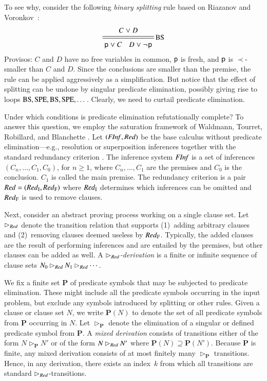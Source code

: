 \begin{rep}
To see why, consider the following \emph{binary splitting} rule
based on Riazanov and Vo\-ro\-nkov~\cite{riazanov-voronkov-2001}:
%
\[\namedsimp{BS}{C \cor D}{\cst{p} \cor C \quad D \cor \neglit{\cst{p}}}\]
%
Provisos: $C$ and $D$ have no free variables in common, $\mathsf{p}$ is fresh, and
$\mathsf{p}$ is $\prec$-smaller than $C$ and $D$. Since the conclusions are
smaller than the premise, the rule can be applied aggressively as a
simplification. But notice that the effect of splitting can be undone by
singular predicate elimination, possibly giving rise to loops
$\textsc{BS}, \textsc{SPE}, \textsc{BS}, \textsc{SPE}, \dotsc$.
Clearly, we need to curtail predicate elimination.

Under which conditions is predicate elimination refutationally complete? To
answer this question, we employ the saturation framework of Waldmann, Tourret,
Robillard, and Blanchette \cite{wtrb-20-sat-framework}. Let
$(\mathit{FInf}, \mathit{Red})$ be the base calculus without predicate elimination---e.g.,
resolution or superposition inferences together with the standard
redundancy criterion \cite[Sect.~4.2]{bg-01-resolution}. The
inference system $\mathit{FInf}$ is a set of inferences $(C_n,\ldots,C_1,C_0)$, for $n
\ge 1$, where $C_n,\ldots,C_1$ are the premises and $C_0$ is the conclusion.
$C_1$ is called the main premise. %
The redundancy criterion is a pair $\mathit{Red} = (\mathit{Red}_\mathrm{I}, \mathit{Red}_\mathrm{F})$ where $\mathit{Red}_\mathrm{I}$
determines which inferences can be omitted and $\mathit{Red}_\mathrm{F}$ is used to remove
clauses.

Next, consider an abstract proving process working on a single clause set.
Let $\rhd_{\mathit{Red}}$ denote the transition relation that supports (1)~adding
arbitrary clauses and (2)~removing clauses deemed useless by $\mathit{Red}_\mathrm{F}$.
Typically, the added clauses are the result of performing inferences and are
entailed by the premises, but other clauses can be added as well. A
\emph{$\rhd_{\mathit{Red}}$-derivation} is a finite or infinite sequence of clause sets
$N_0 \rhd_{\mathit{Red}} N_1 \rhd_{\mathit{Red}} \cdots$.

We fix a finite set $\mathbf{P}$ of predicate symbols that may be subjected to
predicate elimination. These might include all the predicate symbols occurring
in the input problem, but exclude any symbols introduced by splitting or other
rules. Given a clause or clause set $N$, we write $\mathbf{P}(N)$ to denote the
set of all predicate symbols from $\mathbf{P}$ occurring in $N.$
%
Let $\rhd_\mathbf{P}$ denote the elimination of a
singular or defined predicate symbol from $\mathbf{P}$. A \emph{mixed
derivation} consists of transitions either of the form $N
\rhd_\mathbf{P} N'$ or of the form $N \rhd_{\mathit{Red}} N'$ where
$\mathbf{P}(N) \supseteq \mathbf{P}(N')$.
Because $\mathbf{P}$ is finite, any mixed derivation consists of at most
finitely many $\rhd_\mathbf{P}$ transitions. Hence, in any derivation,
there exists an index~$k$ from which all transitions are standard
${\rhd}_{\mathit{Red}}$-transitions.


\end{rep}

